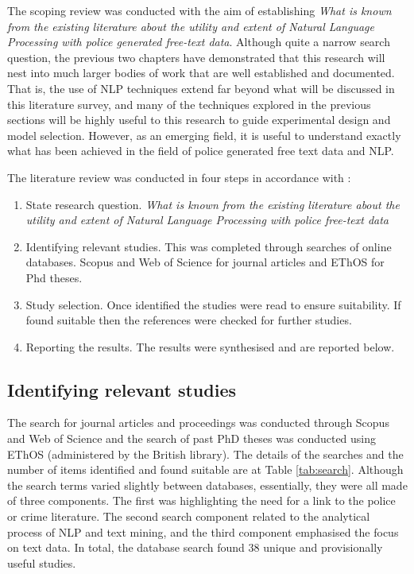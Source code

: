 The scoping review was conducted with the aim of establishing \emph{What is known from the existing literature about the utility and extent of Natural Language Processing with police generated free-text data}. Although quite a narrow search question, the previous two chapters have demonstrated that this research will nest into much larger bodies of work that are well established and documented. That is, the use of NLP techniques extend far beyond what will be discussed in this literature survey, and many of the techniques explored in the previous sections will be highly useful to this research to guide experimental design and model selection. However, as an emerging field, it is useful to understand exactly what has been achieved in the field of police generated free text data and NLP.

The literature review was conducted in four steps in accordance with \textcite{arksey2005scoping}:

\begin{enumerate}

\item State research question. \emph{What is known from the existing literature about the utility and extent of Natural Language Processing with police free-text data}
\item Identifying relevant studies. This was completed through searches of online databases. Scopus and Web of Science for journal articles and EThOS for Phd theses.

\item Study selection. Once identified the studies were read to ensure suitability. If found suitable then the references were checked for further studies.

\item Reporting the results. The results were synthesised and are reported below.


\end{enumerate}


\subsection{Identifying relevant studies}

The search for journal articles and proceedings was conducted through Scopus and Web of Science and the search of past PhD theses was conducted using EThOS (administered by the British library). The details of the searches and the number of items identified and found suitable are at Table \ref{tab:search}. Although the search terms varied slightly between databases, essentially, they were all made of three components. The first was highlighting the need for a link to the police or crime literature. The second search component related to the analytical process of NLP and text mining, and the third component emphasised the focus on text data. In total, the database search found 38 unique and provisionally useful studies.


